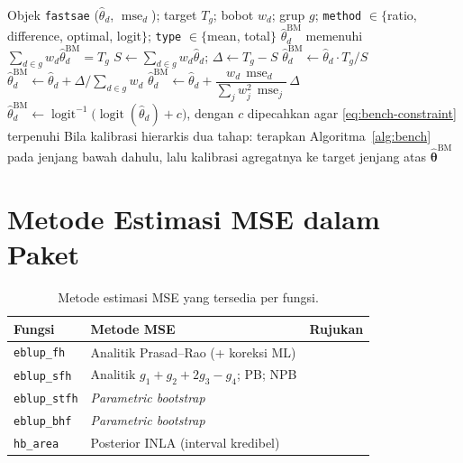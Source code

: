 \documentclass[11pt,a4paper]{article}
\theoremstyle{definition}
\begin{document}
\begin{algorithm}[H]
\caption{\texttt{benchmark\_sae}: kalibrasi benchmarking}
\label{alg:bench}
\begin{algorithmic}[1]
\Require Objek \texttt{fastsae} ($\hat{\theta}_d$, $\operatorname{mse}_d$);
  target $T_g$; bobot $w_d$; grup $g$; \texttt{method} $\in\{$ratio, difference,
  optimal, logit$\}$; \texttt{type} $\in\{$mean, total$\}$
\Ensure $\hat{\theta}_d^{\text{BM}}$ memenuhi $\sum_{d \in g} w_d\hat{\theta}_d^{\text{BM}} = T_g$
\State $S \gets \sum_{d \in g} w_d\hat{\theta}_d$; $\Delta \gets T_g - S$
  \State $\hat{\theta}_d^{\text{BM}} \gets \hat{\theta}_d \cdot T_g / S$
  \State $\hat{\theta}_d^{\text{BM}} \gets \hat{\theta}_d + \Delta / \sum_{d \in g} w_d$
  \State $\hat{\theta}_d^{\text{BM}} \gets \hat{\theta}_d
    + \dfrac{w_d\,\operatorname{mse}_d}{\sum_j w_j^2\,\operatorname{mse}_j}\,\Delta$
  \State $\hat{\theta}_d^{\text{BM}} \gets
    \operatorname{logit}^{-1}\!\bigl(\operatorname{logit}(\hat{\theta}_d) + c\bigr)$,
    dengan $c$ dipecahkan agar \eqref{eq:bench-constraint} terpenuhi
\EndIf
\State Bila kalibrasi hierarkis dua tahap: terapkan Algoritma~\ref{alg:bench}
  pada jenjang bawah dahulu, lalu kalibrasi agregatnya ke target jenjang atas
\State \Return $\hat{\boldsymbol{\theta}}^{\text{BM}}$
\end{algorithmic}
\end{algorithm}

\section{Metode Estimasi MSE dalam Paket}

\begin{table}[h]
\centering
\caption{Metode estimasi MSE yang tersedia per fungsi.}
\label{tab:mse}
\begin{tabular}{@{}lll@{}}
\toprule
Fungsi & Metode MSE & Rujukan \\
\midrule
\texttt{eblup\_fh}   & Analitik Prasad--Rao (+ koreksi ML) & \cite{prasad1990,datta2000} \\
\texttt{eblup\_sfh}  & Analitik $g_1{+}g_2{+}2g_3{-}g_4$; PB; NPB & \cite{singh2005,gonzalez2008} \\
\texttt{eblup\_stfh} & \emph{Parametric bootstrap} & \cite{marhuenda2013} \\
\texttt{eblup\_bhf}  & \emph{Parametric bootstrap} & \cite{battese1988} \\
\texttt{hb\_area}    & Posterior INLA (interval kredibel) & \cite{rue2009} \\
\bottomrule
\end{tabular}
\end{table}
\end{document}
